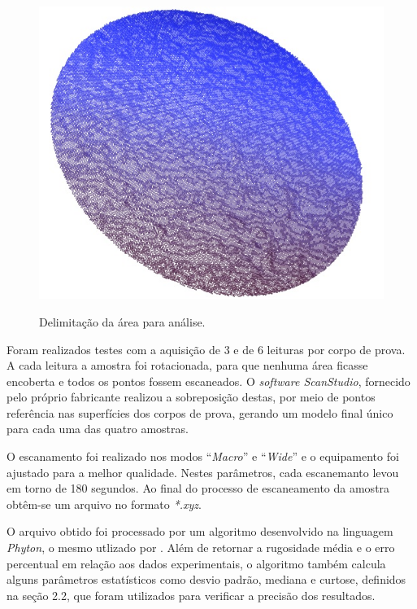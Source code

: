\begin{figure}[!ht]
\centering
{\includegraphics[scale=0.5]{figures/cp2.jpg}}\\
\caption{Delimitação da área para análise.}
\label{Fig:placaecp}
\end{figure}

Foram realizados testes com a aquisição de 3 e de 6 leituras por corpo de prova. A cada leitura a amostra foi rotacionada, para que nenhuma área ficasse encoberta e todos os pontos fossem escaneados. O \emph{software ScanStudio}, fornecido pelo próprio fabricante realizou a sobreposição destas, por meio de pontos referência nas superfícies dos corpos de prova, gerando um modelo final único para cada uma das quatro amostras.

O escanamento foi realizado nos modos “\emph{Macro}” e “\emph{Wide}” e o equipamento foi ajustado para a melhor qualidade. Nestes parâmetros, cada escanemanto levou em torno de 180 segundos. Ao final do processo de escaneamento da amostra obtêm-se um arquivo no formato \emph{*.xyz}. 

O arquivo obtido foi processado por um algoritmo desenvolvido na linguagem \emph{Phyton}, o mesmo utlizado por . Além de retornar a rugosidade média e o erro percentual em relação aos dados experimentais, o algoritmo também calcula alguns parâmetros estatísticos como desvio padrão, mediana e curtose, definidos na seção 2.2, que foram utilizados para verificar a precisão dos resultados.   

 

